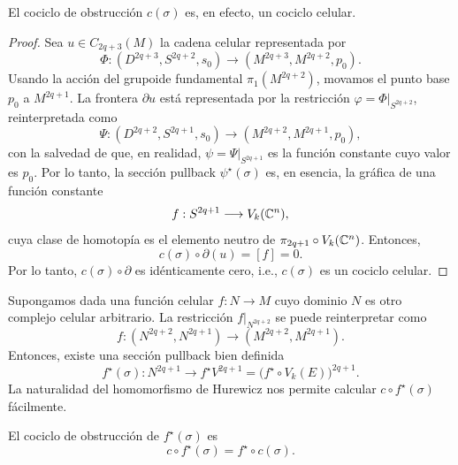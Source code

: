 \begin{proposition}
El cociclo de obstrucción $c(\sigma)$ es, en efecto, un cociclo celular.
\end{proposition}

\begin{proof}
Sea $u \in C_{2q+3}(M)$ la cadena celular representada por
$$\Phi : (D^{2q+3}, S^{2q+2}, s_0) \longrightarrow (M^{2q+3}, M^{2q+2}, p_0).$$
Usando la acción del grupoide fundamental $\pi_1(M^{2q+2})$, movamos el punto base $p_0$ a $M^{2q+1}$. La frontera $\partial u$ está representada por la restricción $\varphi = \Phi \big \vert_{S^{2q+2}}$, reinterpretada como
$$\Psi : (D^{2q+2}, S^{2q+1}, s_0) \longrightarrow (M^{2q+2}, M^{2q+1}, p_0),$$
con la salvedad de que, en realidad, $\psi = \Psi \big \vert_{S^{2q+1}}$ es la función constante cuyo valor es $p_0$. Por lo tanto, la sección pullback $\psi^\star(\sigma)$ es, en esencia, la gráfica de una función constante
$$f : S^{2q+1} \longrightarrow V_k(\mathbb C^n),$$
cuya clase de homotopía es el elemento neutro de $\pi_{2q+1} \circ V_k(\mathbb C^n)$. Entonces,
$$c(\sigma) \circ \partial(u) = [f] = 0.$$
Por lo tanto, $c(\sigma) \circ \partial$ es idénticamente cero, i.e., $c(\sigma)$ es un cociclo celular.
\end{proof}

Supongamos dada una función celular $f : N \to M$ cuyo dominio $N$ es otro complejo celular arbitrario. La restricción $f \big \vert_{N^{2q+2}}$ se puede reinterpretar como
$$f : (N^{2q+2}, N^{2q+1}) \longrightarrow (M^{2q+2}, M^{2q+1}).$$
Entonces, existe una sección pullback bien definida
$$f^\star(\sigma) : N^{2q+1} \longrightarrow f^\star V^{2q+1} = \Big( f^\star \circ V_k(E) \Big)^{2q+1}.$$
La naturalidad del homomorfismo de Hurewicz nos permite calcular $c \circ f^\star(\sigma)$ fácilmente.

\begin{proposition}[Naturalidad]
El cociclo de obstrucción de $f^\star(\sigma)$ es
$$c \circ f^\star(\sigma) = f^\star \circ c(\sigma).$$
\end{proposition}

